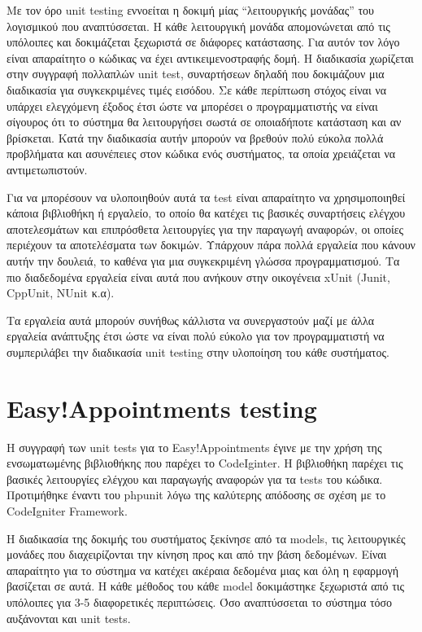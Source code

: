 Με τον όρο unit testing εννοείται η δοκιμή μίας “λειτουργικής μονάδας” του λογισμικού που αναπτύσσεται. Η κάθε λειτουργική μονάδα απομονώνεται από τις υπόλοιπες και δοκιμάζεται ξεχωριστά σε διάφορες κατάστασης. Για αυτόν τον λόγο είναι απαραίτητο ο κώδικας να έχει αντικειμενοστραφής δομή. Η διαδικασία χωρίζεται στην συγγραφή πολλαπλών unit test, συναρτήσεων δηλαδή που δοκιμάζουν μια διαδικασία για συγκεκριμένες τιμές εισόδου. Σε κάθε περίπτωση στόχος είναι να υπάρχει ελεγχόμενη έξοδος έτσι ώστε να μπορέσει ο προγραμματιστής να είναι σίγουρος ότι το σύστημα θα λειτουργήσει σωστά σε οποιαδήποτε κατάσταση και αν βρίσκεται. Κατά την διαδικασία αυτήν μπορούν να βρεθούν πολύ εύκολα πολλά προβλήματα και ασυνέπειες στον κώδικα ενός συστήματος, τα οποία χρειάζεται να αντιμετωπιστούν. 

Για να μπορέσουν να υλοποιηθούν αυτά τα test είναι απαραίτητο να χρησιμοποιηθεί κάποια βιβλιοθήκη ή εργαλείο, το οποίο θα κατέχει τις βασικές συναρτήσεις ελέγχου αποτελεσμάτων και επιπρόσθετα λειτουργίες για την παραγωγή αναφορών, οι οποίες περιέχουν τα αποτελέσματα των δοκιμών. Υπάρχουν πάρα πολλά εργαλεία που κάνουν αυτήν την δουλειά, το καθένα για μια συγκεκριμένη γλώσσα προγραμματισμού. Τα πιο διαδεδομένα εργαλεία είναι αυτά που ανήκουν στην οικογένεια xUnit (Junit, CppUnit, NUnit κ.α).

Τα εργαλεία αυτά μπορούν συνήθως κάλλιστα να συνεργαστούν μαζί με άλλα εργαλεία ανάπτυξης έτσι ώστε να είναι πολύ εύκολο για τον προγραμματιστή να συμπεριλάβει την διαδικασία unit testing στην υλοποίηση του κάθε συστήματος.

\section {Easy!Appointments testing}
Η συγγραφή των unit tests για το Easy!Appointments έγινε με την χρήση της ενσωματωμένης βιβλιοθήκης που παρέχει το CodeIginter. Η βιβλιοθήκη παρέχει τις βασικές λειτουργίες ελέγχου και παραγωγής αναφορών για τα tests του κώδικα. Προτιμήθηκε έναντι του phpunit λόγω της καλύτερης απόδοσης σε σχέση με το CodeIgniter Framework. 

Η διαδικασία της δοκιμής του συστήματος ξεκίνησε από τα models, τις λειτουργικές μονάδες που διαχειρίζονται την κίνηση προς και από την βάση δεδομένων. Είναι απαραίτητο για το σύστημα να κατέχει ακέραια δεδομένα μιας και όλη η εφαρμογή βασίζεται σε αυτά. Η κάθε μέθοδος του κάθε model δοκιμάστηκε ξεχωριστά από τις υπόλοιπες για 3-5 διαφορετικές περιπτώσεις. Όσο αναπτύσσεται το σύστημα τόσο αυξάνονται και unit tests.

